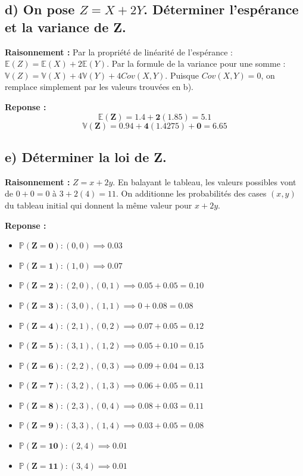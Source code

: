 \documentclass[11pt,a4paper]{article}
\begin{document}
\subsection*{d) On pose $Z=X+2Y$. Déterminer l'espérance et la variance de Z.}

\textbf{Raisonnement :} 
Par la propriété de linéarité de l'espérance : $\mathbb{E}(Z) = \mathbb{E}(X) + 2\mathbb{E}(Y)$.
Par la formule de la variance pour une somme : $\mathbb{V}(Z) = \mathbb{V}(X) + 4\mathbb{V}(Y) + 4 Cov(X, Y)$.
Puisque $Cov(X, Y) = 0$, on remplace simplement par les valeurs trouvées en b).

\textbf{Reponse :}
$$ \mathbf{\mathbb{E}(Z) = 1.4 + 2(1.85) = 5.1} $$
$$ \mathbf{\mathbb{V}(Z) = 0.94 + 4(1.4275) + 0 = 6.65} $$

\subsection*{e) Déterminer la loi de Z.}

\textbf{Raisonnement :} 
$Z = x + 2y$. En balayant le tableau, les valeurs possibles vont de $0 + 0 = 0$ à $3 + 2(4) = 11$.
On additionne les probabilités des cases $(x,y)$ du tableau initial qui donnent la même valeur pour $x+2y$.

\textbf{Reponse :}
\begin{itemize}
    \item $\mathbf{\mathbb{P}(Z=0)} : (0,0) \implies \mathbf{0.03}$
    \item $\mathbf{\mathbb{P}(Z=1)} : (1,0) \implies \mathbf{0.07}$
    \item $\mathbf{\mathbb{P}(Z=2)} : (2,0), (0,1) \implies 0.05 + 0.05 = \mathbf{0.10}$
    \item $\mathbf{\mathbb{P}(Z=3)} : (3,0), (1,1) \implies 0 + 0.08 = \mathbf{0.08}$
    \item $\mathbf{\mathbb{P}(Z=4)} : (2,1), (0,2) \implies 0.07 + 0.05 = \mathbf{0.12}$
    \item $\mathbf{\mathbb{P}(Z=5)} : (3,1), (1,2) \implies 0.05 + 0.10 = \mathbf{0.15}$
    \item $\mathbf{\mathbb{P}(Z=6)} : (2,2), (0,3) \implies 0.09 + 0.04 = \mathbf{0.13}$
    \item $\mathbf{\mathbb{P}(Z=7)} : (3,2), (1,3) \implies 0.06 + 0.05 = \mathbf{0.11}$
    \item $\mathbf{\mathbb{P}(Z=8)} : (2,3), (0,4) \implies 0.08 + 0.03 = \mathbf{0.11}$
    \item $\mathbf{\mathbb{P}(Z=9)} : (3,3), (1,4) \implies 0.03 + 0.05 = \mathbf{0.08}$
    \item $\mathbf{\mathbb{P}(Z=10)} : (2,4) \implies \mathbf{0.01}$
    \item $\mathbf{\mathbb{P}(Z=11)} : (3,4) \implies \mathbf{0.01}$
\end{itemize}
\end{document}
